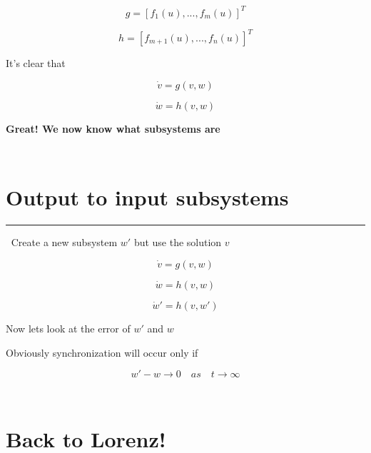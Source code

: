 \documentclass{article}
\begin{document}
\begin{equation}
g = [f_1(u),...,f_m(u)]^T
\end{equation}

\begin{equation}
h = [f_{m+1}(u),...,f_n(u)]^T
\end{equation}

It's clear that

\begin{equation}
\dot{v} = g(v,w)
\end{equation}

\begin{equation}
\dot{w} = h(v,w)
\end{equation}

\textbf{Great! We now know what subsystems are}

$\:$

$\:$

\section{Output to input subsystems}\label{output-to-input-subsystems}

\begin{center}\rule{3in}{0.4pt}\end{center}

$\:$ Create a new subsystem $w'$ but use the solution $v$

\begin{equation}
\dot{v} = g(v,w)
\end{equation}

\begin{equation}
\dot{w} = h(v,w)
\end{equation}

\begin{equation}
\dot{w}' = h(v,w')
\end{equation}

Now lets look at the error of $w'$ and $w$

Obviously synchronization will occur only if

\begin{equation}
w'-w \rightarrow 0 \quad as \quad t\rightarrow \infty 
\end{equation}

$\:$

$\:$

\section{Back to Lorenz!}\label{back-to-lorenz}
\end{document}
